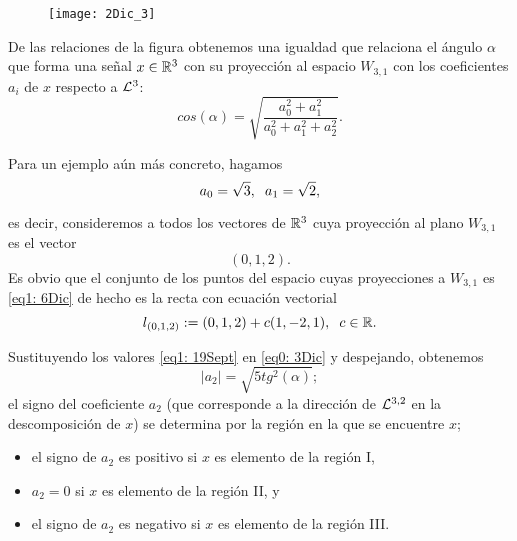 \begin{ej}
\begin{itemize}
\begin{figure}[H]
\centering\captionsetup{format = hang}
	\begin{measuredfigure}
		\texttt{[image: 2Dic\_3]} 
		\caption{}
 	\end{measuredfigure}
 \end{figure}

De las relaciones de la figura 
obtenemos una igualdad que relaciona el ángulo 
$\alpha$ que forma una señal $x \in \mathbb{R}^{3}$ 
con su proyección al espacio $W_{3,1}$
con los coeficientes $a_{i}$
de $x$ respecto a $\mathcal{L}^{3}$:
\begin{equation}
\label{eq0: 3Dic}
cos(\alpha)= \sqrt{\frac{a_{0}^{2}+a_{1}^{2}}{a_{0}^{2}+a_{1}^{2}+a_{2}^{2}}}.
\end{equation}

Para un ejemplo aún más concreto, hagamos 
\begin{equation}
\label{eq1: 19Sept}
a_{0}= \sqrt{3}, \hspace{0.2cm} a_{1}= \sqrt{2},
\end{equation}



es decir, consideremos a todos los vectores de $\mathbb{R}^{3}$
cuya proyección al plano $W_{3,1}$ es 
el vector
\begin{equation}
\label{eq1: 6Dic}
(0,1,2).
\end{equation}
Es obvio que el conjunto de los puntos
del espacio cuyas proyecciones a 
$W_{3,1}$ es \eqref{eq1: 6Dic} de hecho es la recta
con ecuación vectorial
\begin{equation}
\label{eq0: 6Dic}
l_{(0,1,2)} := (0,1,2)+c(1,-2,1), \hspace{0.2cm} c \in \mathbb{R}.
\end{equation}

Sustituyendo
los valores \eqref{eq1: 19Sept} en \eqref{eq0: 3Dic} y
despejando, obtenemos 
\[
|a_{2}|= \sqrt{5 tg^{2}(\alpha)};
\]
el signo del coeficiente $a_{2}$ (que corresponde a la dirección
de $\mathcal{L}^{3,2}$ en la descomposición de $x$) se determina por
la región en la que se encuentre $x$;

\begin{itemize}
\item el signo de $a_{2}$ es positivo si $x$ es elemento de la región I,
\item $a_{2}=0$ si $x$ es elemento de la región II, y
\item el signo de $a_{2}$ es negativo si $x$ es elemento de la región III.
\end{itemize}



\end{itemize}
\end{ej}
